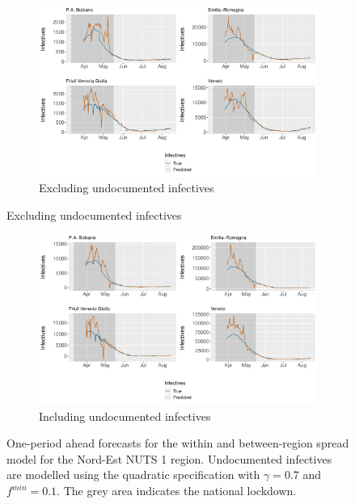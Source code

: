 \documentclass[12pt]{article}
\begin{document}
\begin{appendices}
		\begin{figure}[H]
    	    \centering
    	    \begin{subfigure}{\textwidth}
    	      \centering
    	      \includegraphics[width=0.91\linewidth]{output/model_between_lag14_forecast_start20_Nord-Est_rolling.pdf}
    	      \caption{Excluding undocumented infectives}
    	      \label{fig:forecast_between_nordest_regular}
    	    \end{subfigure}
        \end{figure}
        \begin{figure}[H]\ContinuedFloat
    	    \begin{subfigure}{\textwidth}
    	      \centering
    	      \includegraphics[width=0.91\linewidth]{output/model_between_lag14_forecast_start20_Nord-Est_UndocQuadratic_rolling.pdf}
    	      \caption{Including undocumented infectives}
    	      \label{fig:forecast_between_nordest_undoc}
    	    \end{subfigure}
    	    \caption{One-period ahead forecasts for the within and between-region spread model for the Nord-Est NUTS 1 region. Undocumented infectives are modelled using the quadratic specification with $\gamma = 0.7$ and $f^{min}=0.1$. The grey area indicates the national lockdown.}
    	    \label{fig:forecast_between_nordest}
        \end{figure}
        

\end{appendices}
\end{document}
